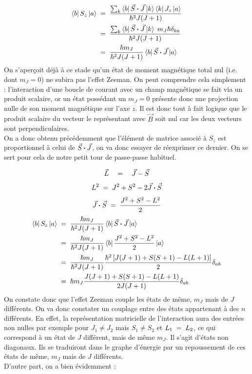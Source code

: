\begin{align*}
    \bra{b}S_z\ket{a}
    &\; = \;
    \dfrac{\sum_k \bra{b}\vec{S}\boldsymbol{\cdot}\vec{J}\ket{k}\bra{k}J_z\ket{a}}{\hbar^2 J(J+1)}\\
     &\; = \;
    \dfrac{\sum_k \bra{b}\vec{S}\boldsymbol{\cdot}\vec{J} \ket{k} \; m_J\hbar \delta_{ka}}{\hbar^2 J(J+1)}\\
    &\; = \;
    \dfrac{\hbar m_J}{\hbar^2 J(J+1)} \bra{b}\vec{S}\boldsymbol{\cdot}\vec{J}\ket{a}
\end{align*}
On s'aperçoit déjà à ce stade qu'un état de moment magnétique total nul (i.e. dont $m_J = 0$) ne subira pas l'effet Zeeman. On peut comprendre cela simplement : l'interaction d'une boucle de courant avec un champ magnétique se fait via un produit scalaire, or un état possédant un  $m_J = 0$ présente donc une projection nulle de son moment magnétique sur l'axe $z$. Il est donc tout à fait logique que le produit scalaire du vecteur le représentant avec $\vec{B}$ soit nul car les deux vecteurs sont perpendiculaires.\\
On a donc obtenu précédemment que l'élément de matrice associé à $S_z$ est proportionnel à celui de $\vec{S}\boldsymbol{\cdot}\vec{J}$, on va donc essayer de réexprimer ce dernier. On se sert pour cela de notre petit tour de passe-passe habituel.

\[
    \vec{L} \quad = \quad \vec{J} - \vec{S}
\]
\[
    L^2 \; = \; J^2 + S^2 - 2\vec{J}\boldsymbol{\cdot} \vec{S}
\]
\[
    \vec{J}\boldsymbol{\cdot} \vec{S} \; = \; \dfrac{J^2 + S^2 - L^2}{2}
\]
\begin{align*}
    \bra{b}S_z\ket{a}
    &\; = \;
    \dfrac{\hbar m_J}{\hbar^2 J(J+1)} \bra{b}\vec{S}\boldsymbol{\cdot}\vec{J}\ket{a}\\
    &\; = \;
    \dfrac{\hbar m_J}{\hbar^2 J(J+1)} \bra{b}  \dfrac{J^2 + S^2 - L^2}{2}  \ket{a}\\
    &\; = \;
    \dfrac{\hbar m_J}{\hbar^2 J(J+1)} \dfrac{\hbar^2 \left[J(J+1) + S(S+1) - L(L+1) \right]}{2}\delta_{ab}\\
    &\; = \;
    \hbar m_J \dfrac{J(J+1) + S(S+1) - L(L+1) }{2J(J+1)} \delta_{ab}
\end{align*}
On constate donc que l'effet Zeeman couple les états de même, $m_J$ mais de $J$ différents. On va donc constater un couplage entre des états appartenant à des $n$ différents. En effet, la représentation matricielle de l'interaction aura des entrées non nulles par exemple pour $J_1\neq J_2$ mais $S_1\neq S_2$ et $L_1 \; = \; L_2$, ce qui correspond à un état de $J$ différent, mais de même $m_J$. Il s'agit d'états non diagonaux. Ils se traduiront dans le graphe d'énergie par un repoussement de ces états de même, $m_J$ mais de $J$ différents.\\
D'autre part, on a bien évidemment :

